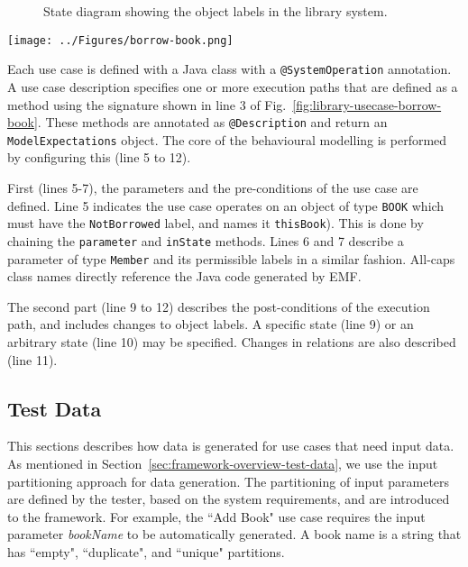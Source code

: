 \begin{figure}[h]
\centering
{}
\hfil
{}
\caption{State diagram showing the object labels in the library system.}
\label{fig:library-object-labels}
\end{figure} 

\begin{figure*}[h]
\centering
\texttt{[image: ../Figures/borrow-book.png]}
\caption{The behavioural modelling for ``Borrow Book" use case using our DSL.}
\label{fig:library-usecase-borrow-book}
\end{figure*}

Each use case is defined with a Java class with a \texttt{@SystemOperation} annotation. A use case description specifies one or more execution paths that are defined as a method using the signature shown in line 3 of Fig.~\ref{fig:library-usecase-borrow-book}. These methods are annotated as \texttt{@Description} and return an \texttt{ModelExpectations} object. The core of the behavioural modelling is performed by configuring this (line 5 to 12). 

First (lines 5-7), the parameters and the pre-conditions of the use case are defined. 
Line 5 indicates the use case operates on an object of type \texttt{BOOK} which must have the \texttt{NotBorrowed} label, and names it \texttt{thisBook}). This is done by chaining the \texttt{parameter} and \texttt{inState} methods. Lines 6 and 7 describe a parameter of type \texttt{Member} and its permissible labels in a similar fashion. All-caps class names directly reference the Java code generated by EMF. 

The second part (line 9 to 12) describes the post-conditions of the execution path, and includes changes to object labels.
A specific state (line 9) or an arbitrary state (line 10) may be specified. Changes in relations are also described (line 11). 

\subsection{Test Data}
\label{sec:create-test model-data}
This sections describes how data is generated for use cases that need input data. As mentioned in Section~\ref{sec:framework-overview-test-data}, we use the input partitioning approach for data generation. The partitioning of input parameters are defined by the tester, based on the system requirements, and are introduced to the framework. For example, the ``Add Book" use case requires the input parameter \textit{bookName} to be automatically generated. A book name is a string that has ``empty", ``duplicate", and ``unique" partitions.

